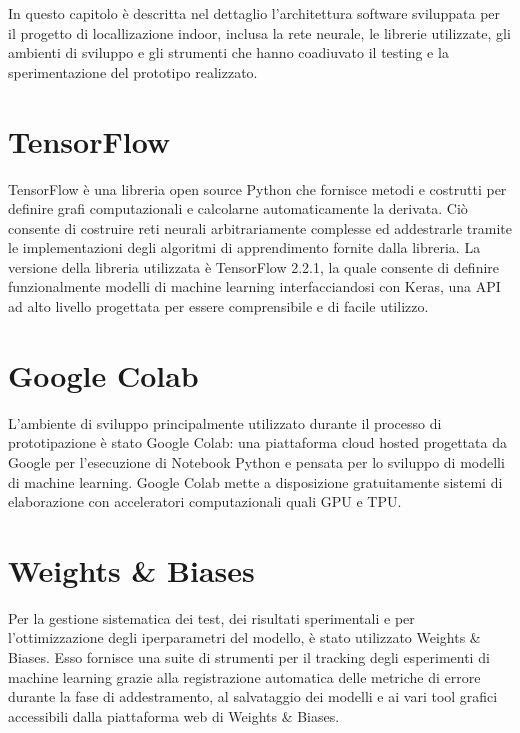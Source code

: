 
\newcommand{\yhatone}{\bm\hat{\bm y}_1}
\newcommand{\yhattwo}{\bm\hat{\bm y}_2}
\newcommand{\yold}{\bm y_{\mathit{old}}}
In questo capitolo è descritta nel dettaglio l'architettura software sviluppata
per il progetto di locallizazione indoor, inclusa la rete neurale, le librerie
utilizzate, gli ambienti di sviluppo e gli strumenti che hanno coadiuvato il
testing e la sperimentazione del prototipo realizzato.
\section{TensorFlow}
TensorFlow è una libreria open source Python che fornisce metodi e costrutti per definire
grafi computazionali e calcolarne automaticamente la derivata. Ciò consente di
costruire reti neurali arbitrariamente complesse ed addestrarle tramite le
implementazioni degli algoritmi di apprendimento fornite dalla libreria. La
versione della libreria utilizzata è TensorFlow 2.2.1, la quale consente di
definire funzionalmente modelli di machine learning interfacciandosi con Keras,
una API ad alto livello progettata per essere comprensibile e di facile
utilizzo.
\section{Google Colab}
L'ambiente di sviluppo principalmente utilizzato durante il processo di
prototipazione è stato Google Colab: una piattaforma cloud hosted progettata da
Google per l'esecuzione di Notebook Python e pensata per lo sviluppo di modelli
di machine learning. Google Colab mette a disposizione gratuitamente sistemi di
elaborazione con acceleratori computazionali quali GPU e TPU\@.
\section{Weights \& Biases}
Per la gestione sistematica dei test, dei risultati sperimentali e per
l'ottimizzazione degli iperparametri del modello, è stato utilizzato Weights \&
Biases. Esso fornisce una suite di strumenti per il tracking degli esperimenti
di machine learning grazie alla registrazione automatica delle metriche di
errore durante la fase di addestramento, al salvataggio dei modelli e ai vari
tool grafici accessibili dalla piattaforma web di Weights \& Biases.
